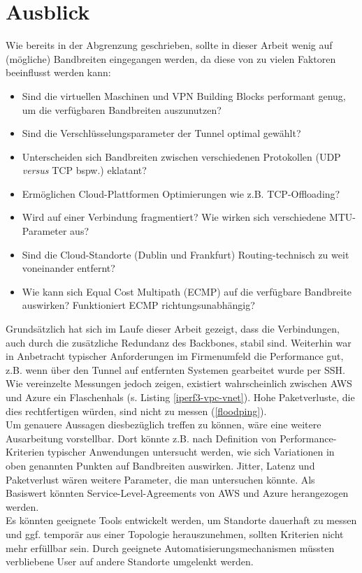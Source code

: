 \section{Ausblick}\label{ausblick}
Wie bereits in der Abgrenzung geschrieben, sollte in dieser Arbeit wenig auf (mögliche) Bandbreiten eingegangen werden, da diese von zu vielen Faktoren beeinflusst werden kann:
\begin{itemize}
    \item Sind die virtuellen Maschinen und \gls{VPN} Building Blocks performant genug, um die verfügbaren Bandbreiten auszunutzen?
    \item Sind die Verschlüsselungsparameter der Tunnel optimal gewählt?
    \item Unterscheiden sich Bandbreiten zwischen verschiedenen Protokollen (\gls{UDP} \textit{versus} \gls{TCP} bspw.) eklatant?
    \item Ermöglichen Cloud-Plattformen Optimierungen wie z.B. \gls{TCP}-Offloading?
    \item Wird auf einer Verbindung fragmentiert? Wie wirken sich verschiedene \gls{MTU}-Parameter aus?
    \item Sind die Cloud-Standorte (Dublin und Frankfurt) Routing-technisch zu weit voneinander entfernt?
    \item Wie kann sich Equal Cost Multipath (ECMP) auf die verfügbare Bandbreite auswirken? Funktioniert ECMP richtungsunabhängig?
\end{itemize}
Grundsätzlich hat sich im Laufe dieser Arbeit gezeigt, dass die Verbindungen, auch durch die zusätzliche Redundanz des Backbones, stabil sind. Weiterhin war in Anbetracht typischer Anforderungen im Firmenumfeld die Performance gut, z.B. wenn über den Tunnel auf entfernten Systemen gearbeitet wurde per \gls{SSH}. Wie vereinzelte Messungen jedoch zeigen, existiert wahrscheinlich zwischen AWS und Azure ein Flaschenhals (s. Listing \ref{iperf3-vpc-vnet}). Hohe Paketverluste, die dies rechtfertigen würden, sind nicht zu messen (\ref{floodping}).\\
Um genauere Aussagen diesbezüglich treffen zu können, wäre eine weitere Ausarbeitung vorstellbar. Dort könnte z.B. nach Definition von Performance-Kriterien typischer Anwendungen untersucht werden, wie sich Variationen in oben genannten Punkten auf Bandbreiten auswirken. Jitter, Latenz und Paketverlust wären weitere Parameter, die man untersuchen könnte. Als Basiswert könnten Service-Level-Agreements von AWS und Azure herangezogen werden.\\
Es könnten geeignete Tools entwickelt werden, um Standorte dauerhaft zu messen und ggf. temporär aus einer Topologie herauszunehmen, sollten Kriterien nicht mehr erfüllbar sein. Durch geeignete Automatisierungsmechanismen müssten verbliebene User auf andere Standorte \glqq umgelenkt\grqq{} werden.\\
